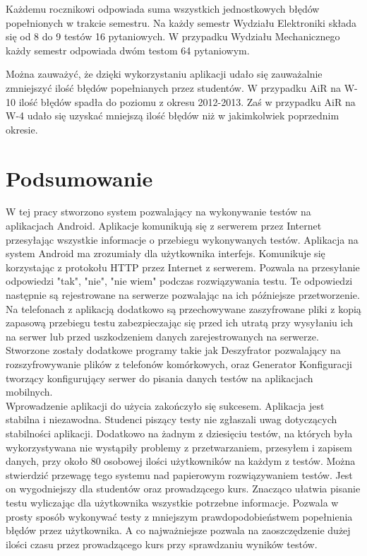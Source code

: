 \documentclass[archivemod, eng]{mgr}
\begin{document}
		Każdemu rocznikowi odpowiada suma wszystkich jednostkowych błędów popełnionych w trakcie semestru. Na każdy semestr Wydziału Elektroniki składa się od 8 do 9 testów 16 pytaniowych. W przypadku Wydziału Mechanicznego każdy semestr odpowiada dwóm testom 64 pytaniowym.
		
		Można zauważyć, że dzięki wykorzystaniu aplikacji udało się zauważalnie zmniejszyć ilość błędów popełnianych przez studentów. W przypadku AiR na W-10 ilość błędów spadła do poziomu z okresu 2012-2013. Zaś w przypadku AiR na W-4 udało się uzyskać mniejszą ilość błędów niż w jakimkolwiek poprzednim okresie.
		
	\chapter{Podsumowanie}
	
	W tej pracy stworzono system pozwalający na wykonywanie testów na aplikacjach Android. Aplikacje komunikują się z serwerem przez Internet przesyłając wszystkie informacje o przebiegu wykonywanych testów. Aplikacja na system Android ma zrozumiały dla użytkownika interfejs. Komunikuje się korzystając z protokołu HTTP przez Internet z serwerem. Pozwala na przesyłanie odpowiedzi "tak", "nie", "nie wiem" podczas rozwiązywania testu. Te odpowiedzi następnie są rejestrowane na serwerze pozwalając na ich późniejsze przetworzenie. Na telefonach z aplikacją dodatkowo są przechowywane zaszyfrowane pliki z kopią zapasową przebiegu testu zabezpieczając się przed ich utratą przy wysyłaniu ich na serwer lub przed uszkodzeniem danych zarejestrowanych na serwerze. Stworzone zostały dodatkowe programy takie jak Deszyfrator pozwalający na rozszyfrowywanie plików z telefonów komórkowych, oraz Generator Konfiguracji tworzący konfigurujący serwer do pisania danych testów na aplikacjach mobilnych.\\
	
	Wprowadzenie aplikacji do użycia zakończyło się sukcesem. Aplikacja jest stabilna i niezawodna. Studenci piszący testy nie zgłaszali uwag dotyczących stabilności aplikacji. Dodatkowo na żadnym z dziesięciu testów, na których była wykorzystywana nie wystąpiły problemy z przetwarzaniem, przesyłem i zapisem danych, przy około 80 osobowej ilości użytkowników na każdym z testów. Można stwierdzić przewagę tego systemu nad papierowym rozwiązywaniem testów. Jest on wygodniejszy dla studentów oraz prowadzącego kurs. Znacząco ułatwia pisanie testu wyliczając dla użytkownika wszystkie potrzebne informacje. Pozwala w prosty sposób wykonywać testy z mniejszym prawdopodobieństwem popełnienia błędów przez użytkownika. A co najważniejsze pozwala na zaoszczędzenie dużej ilości czasu przez prowadzącego kurs przy sprawdzaniu wyników testów.\\
	
\end{document}
